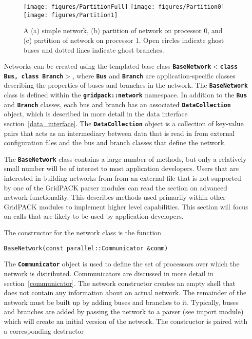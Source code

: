 \begin{figure}
  \centering
    \texttt{[image: figures/PartitionFull]}
    \texttt{[image: figures/Partition0]}
    \texttt{[image: figures/Partition1]}
  \caption{ A (a) simple network, (b) partition of network on processor 0, and (c) partition of network on processor 1. Open circles indicate ghost buses and dotted lines indicate ghost branches.}
  \label{fig:partition}
\end{figure}

Networks can be created using the templated base class
\texttt{\textbf{BaseNetwork$\boldsymbol{\mathrm{<}}$class Bus, class
Branch$\boldsymbol{\mathrm{>}}$}}, where \texttt{\textbf{Bus}} and
\texttt{\textbf{Branch}} are application-specific classes describing the
properties of buses and branches in the network. The
\texttt{\textbf{BaseNetwork}} class is defined within the
\texttt{\textbf{gridpack::network}} namespace. In addition to the
\texttt{\textbf{Bus}} and \texttt{\textbf{Branch}} classes, each bus and branch
has an associated \texttt{\textbf{DataCollection}} object, which is described in
more detail in the data interface section~\ref{data_interface}. The \texttt{\textbf{DataCollection}} object is a collection of key-value pairs that acts as an intermediary between data that is read in from external configuration files and the bus and branch classes that define the network.

The \texttt{\textbf{BaseNetwork}} class contains a large number of methods, but
only a relatively small number will be of interest to most application
developers. Users that are interested in building networks from from an external
file that is not supported by one of the GridPACK parser modules can read the
section on advanced network functionality. This describes methods used primarily within other GridPACK modules to implement higher level capabilities. This section will focus on calls that are likely to be used by application developers.

The constructor for the network class is the function

{
\color{red}
\begin{Verbatim}[fontseries=b]
BaseNetwork(const parallel::Communicator &comm)
\end{Verbatim}
}

The \texttt{\textbf{Communicator}} object is used to define the set of
processors over which the network is distributed. Communicators are discussed in
more detail in section~\ref{communicator}. The network constructor creates an empty shell that does not contain any information about an actual network. The remainder of the network must be built up by adding buses and branches to it. Typically, buses and branches are added by passing the network to a parser (see import module) which will create an initial version of the network. The constructor is paired with a corresponding destructor

